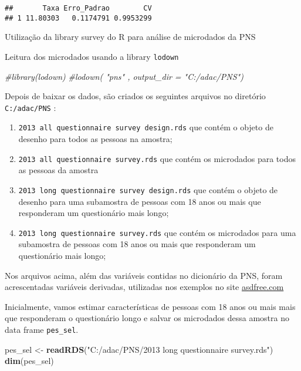 \documentclass[]{book}
\newenvironment{Shaded}{\begin{snugshade}}{\end{snugshade}}
\newcommand{\KeywordTok}[1]{\textcolor[rgb]{0.13,0.29,0.53}{\textbf{{#1}}}}
\newcommand{\StringTok}[1]{\textcolor[rgb]{0.31,0.60,0.02}{{#1}}}
\newcommand{\CommentTok}[1]{\textcolor[rgb]{0.56,0.35,0.01}{\textit{{#1}}}}
\newcommand{\NormalTok}[1]{{#1}}
\theoremstyle{definition}
\theoremstyle{definition}
\theoremstyle{remark}
\let\BeginKnitrBlock\begin \let\EndKnitrBlock\end
\begin{document}
\begin{verbatim}
##       Taxa Erro_Padrao        CV
## 1 11.80303   0.1174791 0.9953299
\end{verbatim}

\BeginKnitrBlock{example}
\protect\hypertarget{ex:unnamed-chunk-35}{}{\label{ex:unnamed-chunk-35}}Utilização
da library survey do R para análise de microdados da PNS
\EndKnitrBlock{example} Leitura dos microdados usando a library
\texttt{lodown}\citep{R-lodown}

\begin{Shaded}
\begin{Highlighting}[]
\CommentTok{#library(lodown)}
\CommentTok{#lodown( "pns" , output_dir = "C:/adac/PNS")}
\end{Highlighting}
\end{Shaded}

Depois de baixar os dados, são criados os seguintes arquivos no
diretório \texttt{C:/adac/PNS} :

\begin{enumerate}
\def\labelenumi{\arabic{enumi}.}
\item
  \texttt{2013\ all\ questionnaire\ survey\ design.rds} que contém o
  objeto de desenho para todos as pessoas na amostra;
\item
  \texttt{2013\ all\ questionnaire\ survey.rds} que contém os microdados
  para todos as pessoas da amostra
\item
  \texttt{2013\ long\ questionnaire\ survey\ design.rds} que contém o
  objeto de desenho para uma subamostra de pessoas com 18 anos ou mais
  que responderam um questionário mais longo;
\item
  \texttt{2013\ long\ questionnaire\ survey.rds} que contém os
  microdados para uma subamostra de pessoas com 18 anos ou mais que
  responderam um questionário mais longo;
\end{enumerate}

\BeginKnitrBlock{remark}
\iffalse {Observação } \fi{} Nos arquivos acima, além das variáveis
contidas no dicionário da PNS, foram acrescentadas variáveis derivadas,
utilizadas nos exemplos no site
\href{https://github.com/ajdamico/asdfree/tree/master/Pesquisa\%20Nacional\%20De\%20Saude}{asdfree.com}
\EndKnitrBlock{remark}

Inicialmente, vamos estimar características de pessoas com 18 anos ou
mais mais que responderam o questionário longo e salvar os microdados
dessa amostra no data frame \texttt{pes\_sel}.

\begin{Shaded}
\begin{Highlighting}[]
\NormalTok{pes_sel <-}\StringTok{ }\KeywordTok{readRDS}\NormalTok{(}\StringTok{"C:/adac/PNS/2013 long questionnaire survey.rds"}\NormalTok{)}
\KeywordTok{dim}\NormalTok{(pes_sel)}
\end{Highlighting}
\end{Shaded}
\end{document}
